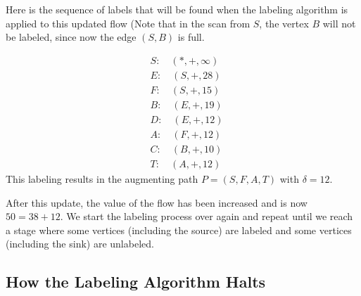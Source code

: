 Here is the sequence of labels that will be found when the labeling
algorithm is applied to this updated flow (Note that in the scan from
$S$, the vertex $B$ will not be labeled, since now the edge
$(S,B)$ is full.

\begin{align*}
  &S:\quad(*,+,\infty)\\
  &E:\quad(S,+,28)\\
  &F:\quad(S,+,15)\\
  &B:\quad(E,+,19)\\
  &D:\quad(E,+,12)\\
  &A:\quad(F,+,12)\\
  &C:\quad(B,+,10)\\
  &T:\quad(A,+,12)
\end{align*} 
This labeling results in the augmenting path $P=(S,F,A,T)$ with
$\delta=12$.

After this update, the value of the flow has been increased and
is now $50=38+12$.
We start the labeling process over again and
repeat until we reach a stage where some vertices
(including the source) are labeled and some vertices (including
the sink) are unlabeled.

\subsection{How the Labeling Algorithm Halts}

